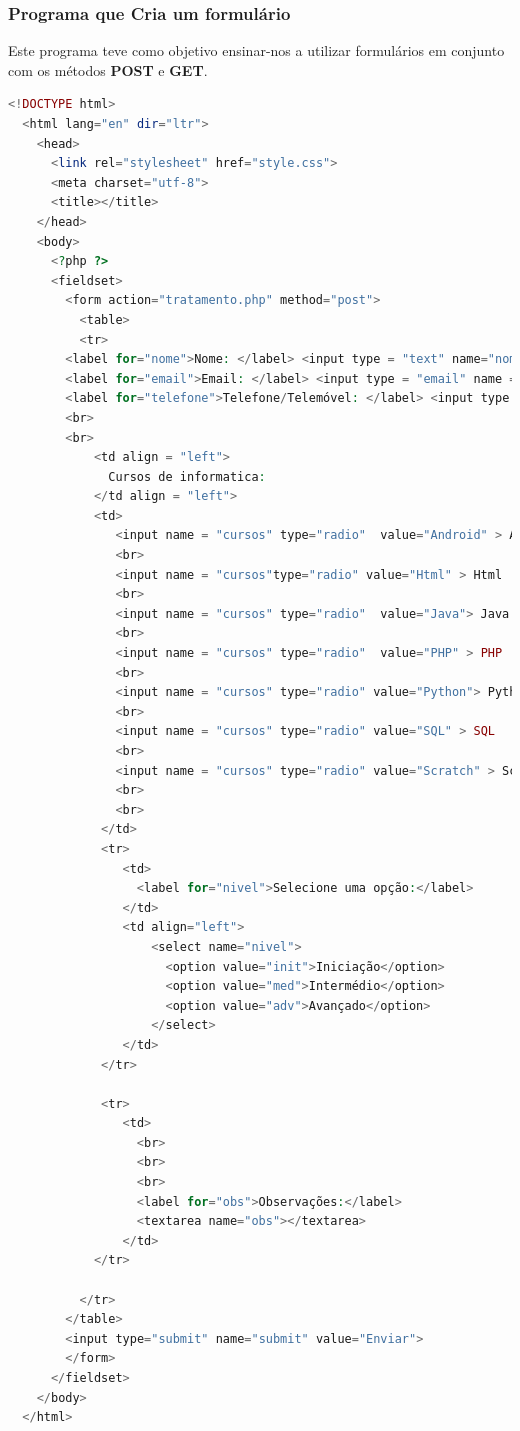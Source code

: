 \documentclass[14pt]{article}
\begin{document}
\subsubsection{Programa que Cria um formulário}

Este programa teve como objetivo ensinar-nos a utilizar formulários em conjunto com os métodos \textbf{POST} e \textbf{GET}.

\begin{lstlisting}[language=PHP]
  <!DOCTYPE html>
  <html lang="en" dir="ltr">
    <head>
      <link rel="stylesheet" href="style.css">
      <meta charset="utf-8">
      <title></title>
    </head>
    <body>
      <?php ?>
      <fieldset>
        <form action="tratamento.php" method="post">
          <table>
          <tr>
        <label for="nome">Nome: </label> <input type = "text" name="nome"><br>
        <label for="email">Email: </label> <input type = "email" name = "email"><br>
        <label for="telefone">Telefone/Telemóvel: </label> <input type = "text" name = "telefone"><br>
        <br>
        <br>
            <td align = "left">
              Cursos de informatica:
            </td align = "left">
            <td>
               <input name = "cursos" type="radio"  value="Android" > Android
               <br>
               <input name = "cursos"type="radio" value="Html" > Html
               <br>
               <input name = "cursos" type="radio"  value="Java"> Java
               <br>
               <input name = "cursos" type="radio"  value="PHP" > PHP
               <br>
               <input name = "cursos" type="radio" value="Python"> Python
               <br>
               <input name = "cursos" type="radio" value="SQL" > SQL
               <br>
               <input name = "cursos" type="radio" value="Scratch" > Scratch
               <br>
               <br>
             </td>
             <tr>
                <td>
                  <label for="nivel">Selecione uma opção:</label>
                </td>
                <td align="left">
                    <select name="nivel">
                      <option value="init">Iniciação</option>
                      <option value="med">Intermédio</option>
                      <option value="adv">Avançado</option>
                    </select>
                </td>
             </tr>

             <tr>
                <td>
                  <br>
                  <br>
                  <br>
                  <label for="obs">Observações:</label>
                  <textarea name="obs"></textarea>
                </td>
            </tr>

          </tr>
        </table>
        <input type="submit" name="submit" value="Enviar">
        </form>
      </fieldset>
    </body>
  </html>
\end{lstlisting}
\end{document}
